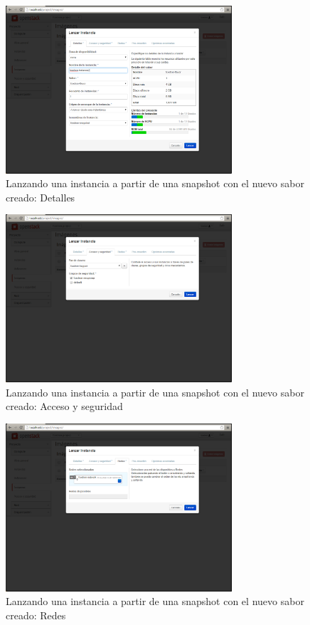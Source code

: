 \documentclass{article}
\begin{document}
\begin{figure}[h]
  \centering
    \includegraphics[width=0.75\textwidth]{img/m_069.png}
  \caption{Lanzando una instancia a partir de una snapshot con el nuevo sabor creado: Detalles}
  \label{fig:LaunchingInstanceFromSnapshot}
\end{figure}	

\begin{figure}[h]
  \centering
    \includegraphics[width=0.75\textwidth]{img/m_070.png}
  \caption{Lanzando una instancia a partir de una snapshot con el nuevo sabor creado: Acceso y seguridad}
  \label{fig:LaunchingInstanceFromSnapshotSecgroup}
\end{figure}	

\begin{figure}[h]
  \centering
    \includegraphics[width=0.75\textwidth]{img/m_071.png}
  \caption{Lanzando una instancia a partir de una snapshot con el nuevo sabor creado: Redes}
  \label{fig:LaunchingInstanceFromSnapshotNetwork}
\end{figure}	
\end{document}
